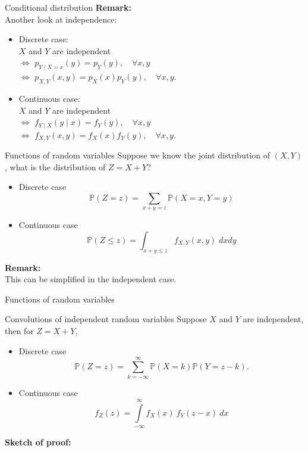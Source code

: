\documentclass [aspectratio=169]{beamer}
\begin{document}
\begin{frame}{Conditional distribution}
\textbf{Remark:}\\
 Another look at independence: \\
 \vspace{0.1in}
 \begin{itemize}
     \item Discrete case:\\
     \quad $X$ and $Y$ are independent \\
     $\Leftrightarrow$ $ p_{Y\mid X = x}(y) = p_Y(y), \quad \forall x,y$\\
     $\Leftrightarrow$ $p_{X,Y}(x,y) = p_X(x)p_Y(y), \quad \forall x,y$.
     \vspace{0.1in}
     \item Continuous case:\\
      \quad $X$ and $Y$ are independent \\
     $\Leftrightarrow$ $ f_{Y\mid X}(y\mid x) = f_Y(y), \quad \forall x,y$\\
     $\Leftrightarrow$ $f_{X,Y}(x,y) = f_X(x)f_Y(y), \quad \forall x,y$.
 \end{itemize}
\end{frame}

\begin{frame}{Functions of random variables}
    Suppose we know the joint distribution of $(X, Y)$, what is the distribution of $Z = X+ Y$?
    \begin{itemize}
        \item Discrete case
        $$
        \mathbb{P}(Z = z) = \sum_{x+y=z}\mathbb{P}(X = x, Y = y)
        $$
        \item Continuous case
        $$
        \mathbb{P}(Z \le z) = \int_{x+y \le z} f_{X,Y}(x,y) \; dx dy
        $$
    \end{itemize}
    \vspace{0.1in}
    \textbf{Remark:}\\
This can be simplified in the independent case.
\end{frame}



\begin{frame}{Functions of random variables}
    \begin{block}{Convolutions of independent random variables}
    Suppose $X$ and $Y$ are independent, then for $Z = X+Y$, 
    \begin{itemize}
        \item Discrete case
        $$
        {\mathbb{P}(Z=z)=\sum _{k=-\infty }^{\infty }\mathbb{P}(X=k)\mathbb{P}(Y=z-k)}.
        $$
        \item Continuous case
        $$
        {\displaystyle f_{Z}(z)=\int \limits _{-\infty }^{\infty }f_{X}(x)~f_{Y}(z-x)~dx}
        $$
    \end{itemize}
    \end{block}
    \vspace{0.1in}
    \textbf{Sketch of proof:}\\
 \vspace{0.5in}
\end{frame}
\end{document}
